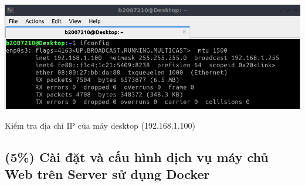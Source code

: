 \documentclass[a4paper, 11pt]{article}
\begin{document}
\begin{minipage}
    {\linewidth}
    \captionsetup{type=figure}
    \centering
    \includegraphics[width=\linewidth]{images/desktop-ifconfig.png}
    \caption{Kiểm tra địa chỉ IP của máy desktop (192.168.1.100)}
    \label{figure:desktop-ifconfig}
\end{minipage}

\subsection{(5\%) Cài đặt và cấu hình dịch vụ máy chủ Web trên Server sử dụng Docker}
\end{document}
